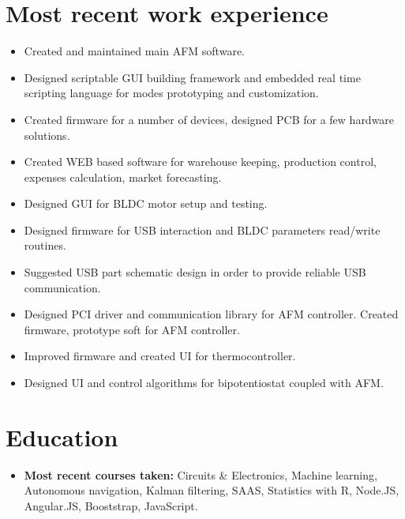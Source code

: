 \documentclass{sb_cv}
\begin{document}
\section{Most recent work experience}
\begin{itemize}
\item Created and maintained main AFM software.
\item Designed scriptable GUI building framework and embedded real time scripting language for modes prototyping and customization.
\item Created firmware for a number of devices, designed PCB for a few hardware solutions.
\item Created WEB based software for warehouse keeping, production control, expenses calculation, market forecasting.
\end{itemize}


\begin{itemize}
\item Designed GUI for BLDC motor setup and testing.
\item Designed firmware for USB interaction and BLDC parameters read/write routines.
\item Suggested USB part schematic design in order to provide reliable USB communication.
\end{itemize}

\begin{itemize}
\item Designed PCI driver and communication library for AFM controller. Created firmware, prototype soft for AFM controller.
\item Improved firmware and created UI for thermocontroller.
\item Designed UI and control algorithms for bipotentiostat coupled with AFM.
\end{itemize}


\section{Education}
\begin{itemize}
\item \textbf{Most recent courses taken:} Circuits \& Electronics, Machine learning, Autonomous navigation, Kalman filtering, SAAS, Statistics with R, Node.JS, Angular.JS, Booststrap, JavaScript.
\end{itemize}
\end{document}

